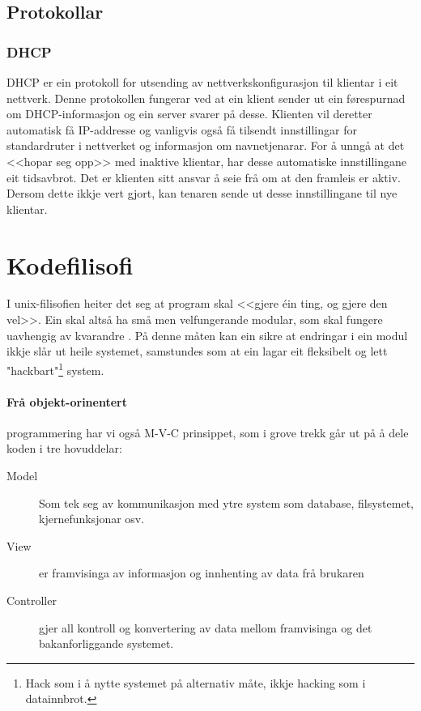 \documentclass[nynorsk,12pt,a4paper,oneside]{book}
\begin{document}
\subsection{Protokollar}
\subsubsection{DHCP}
DHCP er ein protokoll for utsending av nettverkskonfigurasjon til klientar i eit nettverk. Denne protokollen fungerar ved at ein klient sender ut ein førespurnad om DHCP-informasjon og ein server svarer på desse. Klienten vil deretter automatisk få IP-addresse og vanligvis også få tilsendt innstillingar for standardruter i nettverket og informasjon om navnetjenarar.  \cite{datakom} 
For å unngå at det <<hopar seg opp>> med inaktive klientar, har desse automatiske innstillingane eit tidsavbrot. Det er klienten sitt ansvar å seie frå om at den framleis er aktiv. Dersom dette ikkje vert gjort, kan tenaren sende ut desse innstillingane til nye klientar. \cite{rfc2131}


\section{Kodefilisofi}
I unix-filisofien heiter det seg at program skal <<gjere éin ting, og gjere den vel>>. Ein skal altså ha små men velfungerande modular, som skal fungere uavhengig av kvarandre \cite{unixprog}. På denne måten kan ein sikre at endringar i ein modul ikkje slår ut heile systemet, samstundes som at ein lagar eit fleksibelt og lett "hackbart"\footnote{Hack som i å nytte systemet på alternativ måte, ikkje hacking som i datainnbrot.} system. 

\paragraph{Frå objekt-orinentert} programmering har vi også M-V-C prinsippet, som i grove trekk går ut på å dele koden i tre hovuddelar: \cite{mvc}

\begin{description}
	\item[Model] Som tek seg av kommunikasjon med ytre system som database, filsystemet, kjernefunksjonar osv.
	\item[View] er framvisinga av informasjon og innhenting av data frå brukaren
	\item[Controller] gjer all kontroll og konvertering av data mellom framvisinga og det bakanforliggande systemet.
\end{description}
\end{document}
